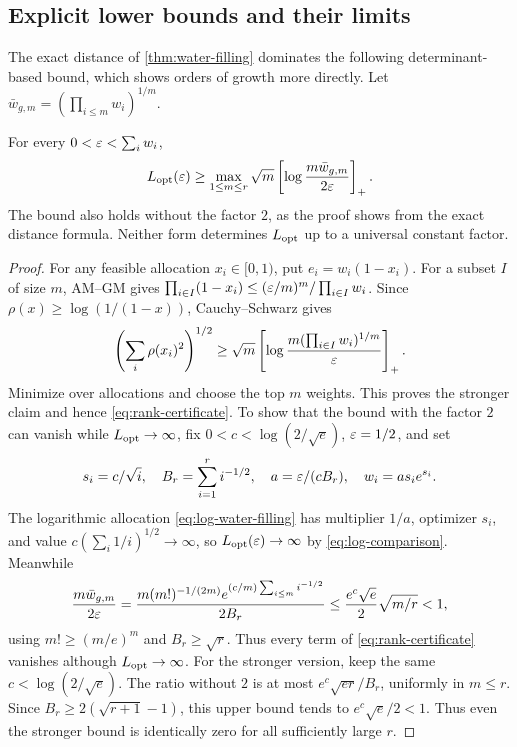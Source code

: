 \subsection{Explicit lower bounds and their limits}
The exact distance of \cref{thm:water-filling} dominates the
following determinant-based bound, which shows orders of growth more
directly. Let $\bar w_{g,m}=(\prod_{i\leq m}w_i)^{1/m}$.
\begin{proposition}
\label{prop:rank-certificate}
For every $0<\varepsilon<\sum_iw_i$,
\begin{equation}
 L_{\mathrm{opt}}(\varepsilon)\geq
 \max_{1\leq m\leq r}\sqrt m
       \left[\log\frac{m\bar w_{g,m}}{2\varepsilon}\right]_+.
 \label{eq:rank-certificate}
\end{equation}
The bound also holds without the factor $2$, as the proof shows from
the exact distance formula. Neither form determines $L_{\mathrm{opt}}$ up to a
universal constant factor.
\end{proposition}
\begin{proof}
For any feasible allocation $x_i\in[0,1)$, put $e_i=w_i(1-x_i)$.
For a subset $I$ of size $m$, AM--GM gives
$\prod_{i\in I}(1-x_i)\leq(\varepsilon/m)^m/\prod_{i\in I}w_i$.
Since $\rho(x)\geq\log(1/(1-x))$, Cauchy--Schwarz gives
\[
 \left(\sum_i\rho(x_i)^2\right)^{1/2}
 \geq\sqrt m\left[\log\frac{m(\prod_{i\in I}w_i)^{1/m}}{\varepsilon}\right]_+.
\]
Minimize over allocations and choose the top $m$ weights. This proves
the stronger claim and hence \eqref{eq:rank-certificate}.
To show that the bound with the factor $2$ can vanish while
$L_{\mathrm{opt}}\to\infty$, fix
$0<c<\log(2/\sqrt e)$, $\varepsilon=1/2$, and set
\[
 s_i=c/\sqrt i,\quad B_r=\sum_{i=1}^r i^{-1/2},\quad
 a=\varepsilon/(cB_r),\quad w_i=a s_i e^{s_i}.
\]
The logarithmic allocation \eqref{eq:log-water-filling} has
multiplier $1/a$, optimizer $s_i$, and value
$c(\sum_i1/i)^{1/2}\to\infty$, so $L_{\mathrm{opt}}(\varepsilon)\to\infty$ by
\eqref{eq:log-comparison}. Meanwhile
\[
 \frac{m\bar w_{g,m}}{2\varepsilon}
 =\frac{m(m!)^{-1/(2m)}e^{(c/m)\sum_{i\leq m}i^{-1/2}}}{2B_r}
 \leq\frac{e^c\sqrt e}{2}\sqrt{m/r}<1,
\]
using $m!\geq(m/e)^m$ and $B_r\geq\sqrt r$. Thus every term of
\eqref{eq:rank-certificate} vanishes although $L_{\mathrm{opt}}\to\infty$.
For the stronger version, keep the same $c<\log(2/\sqrt e)$.
The ratio without $2$ is at most
$e^c\sqrt{er}/B_r$, uniformly in $m\leq r$.
Since $B_r\geq2(\sqrt{r+1}-1)$, this upper bound tends to
$e^c\sqrt e/2<1$. Thus even the stronger bound is identically zero for
all sufficiently large $r$.
\end{proof}

